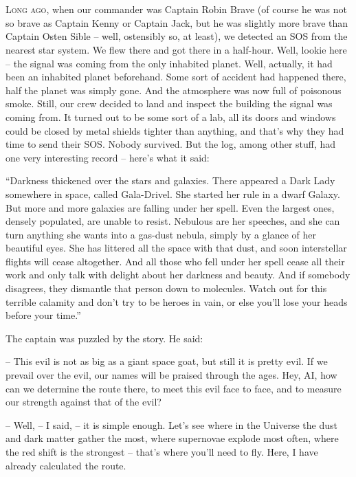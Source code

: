 \documentclass[ebook,oneside,final,openright]{memoir}
\begin{document}
\chapter{}
\par
\lettrine{L}{ong ago,} when our commander was Captain Robin Brave (of course he was not so brave as Captain Kenny or Captain Jack, but he was slightly more brave than Captain Osten Sible – well, ostensibly so, at least), we detected an SOS from the nearest star system. We flew there and got there in a half-hour. Well, lookie here – the signal was coming from the only inhabited planet. Well, actually, it had been an inhabited planet beforehand. Some sort of accident had happened there, half the planet was simply gone. And the atmosphere was now full of poisonous smoke. Still, our crew decided to land and inspect the building the signal was coming from. It turned out to be some sort of a lab, all its doors and windows could be closed by metal shields tighter than anything, and that’s why they had time to send their SOS. Nobody survived. But the log, among other stuff, had one very interesting record – here’s what it said:\par
\par
“Darkness thickened over the stars and galaxies. There appeared a Dark Lady somewhere in space, called Gala-Drivel. She started her rule in a dwarf Galaxy. But more and more galaxies are falling under her spell. Even the largest ones, densely populated, are unable to resist. Nebulous are her speeches, and she can turn anything she wants into a gas-dust nebula, simply by a glance of her beautiful eyes. She has littered all the space with that dust, and soon interstellar flights will cease altogether. And all those who fell under her spell cease all their work and only talk with delight about her darkness and beauty. And if somebody disagrees, they dismantle that person down to molecules. Watch out for this terrible calamity and don’t try to be heroes in vain, or else you’ll lose your heads before your time.”\par
\par
The captain was puzzled by the story. He said:\par
– This evil is not as big as a giant space goat, but still it is pretty evil. If we prevail over the evil, our names will be praised through the ages. Hey, AI, how can we determine the route there, to meet this evil face to face, and to measure our strength against that of the evil?\par
– Well, – I said, – it is simple enough. Let’s see where in the Universe the dust and dark matter gather the most, where supernovae explode most often, where the red shift is the strongest – that’s where you’ll need to fly. Here, I have already calculated the route.\par
\end{document}
